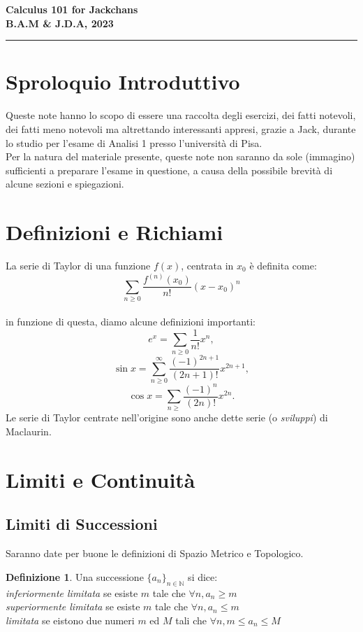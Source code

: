 \documentclass[a4paper,twoside]{article}
\newcommand{\N}{\mathbb{N}}
\theoremstyle{definition}
\newtheorem{definizione}[theorem]{Definizione}
\numberwithin{theorem}{section}
\begin{document}
\setlength\parindent{0pt}
\thispagestyle{empty}
\begin{center}{\large \textbf{ {\Huge Calculus 101 for Jackchans} \\
B.A.M \& J.D.A, 2023}}
\end{center}
\rule{\textwidth}{1pt}
\tableofcontents

\section{Sproloquio Introduttivo}
    Queste note hanno lo scopo di essere una raccolta degli esercizi, dei fatti notevoli, dei fatti meno notevoli ma altrettando interessanti appresi, grazie a Jack, durante lo studio per l'esame di Analisi 1 presso l'università di Pisa.
    \\
    Per la natura del materiale presente, queste note non saranno da sole (immagino) sufficienti a preparare l'esame in questione, a causa della possibile brevità di alcune sezioni e spiegazioni.
    \\
    \section{Definizioni e Richiami}
La serie di Taylor di una funzione $f(x)$, centrata in $x_0$ è definita come:
$$\sum_{n\geq 0}^{}\frac{f^{(n)}(x_0)}{n!}(x-x_0)^n$$ \\
in funzione di questa, diamo alcune definizioni importanti:
$$e^x=\sum_{n\geq 0}\frac{1}{n!}x^n,$$ 
$$\sin x = \sum_{n\geq 0}^{\infty}\frac{(-1)^{2n+1}}{(2n+1)!}x^{2n+1},$$
$$\cos x = \sum_{n\geq }\frac{(-1)^n}{(2n)!}x^{2n}.$$
Le serie di Taylor centrate nell'origine sono anche dette serie (o \emph{sviluppi}) di Maclaurin.


\section{Limiti e Continuità}
\subsection{Limiti di Successioni}
Saranno date per buone le definizioni di Spazio Metrico e Topologico.

\begin{definizione}
Una successione $\{a_n\}_{n\in\N}$ si dice: \\
\textit{inferiormente limitata} se  esiste $m$ tale che $\forall n, a_n\geq m$ \\
\textit{superiormente limitata} se  esiste $m$ tale che $\forall n, a_n\leq m$ \\
\textit{limitata} se eistono due numeri $m$ ed $M$ tali che $\forall n, m\leq a_n\leq M$
\end{definizione}
\end{document}
